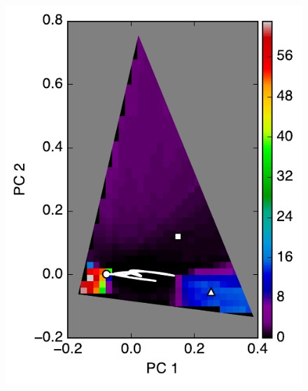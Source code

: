 \documentclass[iop,numberedappendix,apj]{emulateapj}
\begin{document}
\begin{figure}[tbh!]
\begin{minipage}{0.33\hsize}
\begin{center}
\includegraphics[width=\hsize]{mockdata_135deg_3types_t360_lc_noreg.pdf}
    \end{center}
     \end{minipage}
   \begin{minipage}{0.33\hsize}
    \begin{center}

\end{center}
\end{minipage}
\end{figure}
\end{document}
